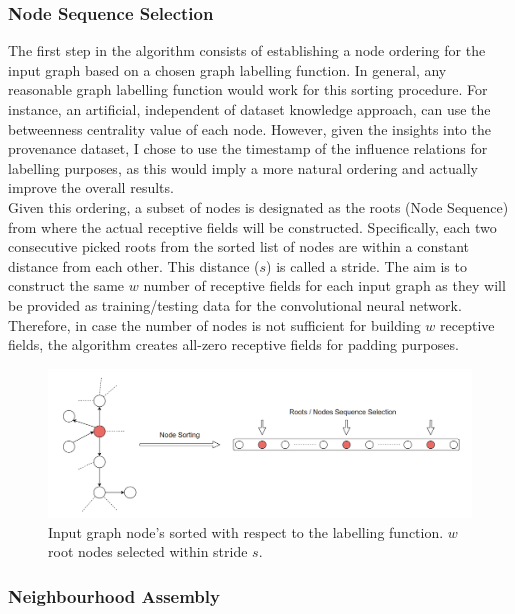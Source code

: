 \subsubsection*{Node Sequence Selection}

The first step in the algorithm consists of establishing a node ordering for the input graph based on a chosen graph labelling function. In general, any reasonable graph labelling function would work for this sorting procedure. For instance, an artificial, independent of dataset knowledge approach, can use the betweenness centrality value of each node. However, given the insights into the provenance dataset, I chose to use the timestamp of the influence relations for labelling purposes, as this would imply a more natural ordering and actually improve the overall results. \\

Given this ordering, a subset of nodes is designated as the roots (Node Sequence) from where the actual receptive fields will be constructed. Specifically, each two consecutive picked roots from the sorted list of nodes are within a constant distance from each other. This distance ($s$) is called a stride. The aim is to construct the same $w$ number of receptive fields for each input graph as they will be provided as training/testing data for the convolutional neural network. Therefore, in case the number of nodes is not sufficient for building $w$ receptive fields, the algorithm creates all-zero receptive fields for padding purposes. \\

\begin{figure}[H]
  \centering
  \includegraphics[scale=0.5]{Images/nodeseqsel.png}
  \caption{Input graph node's sorted with respect to the labelling function. $w$ root nodes selected within stride $s$.}
  \label{nodeseqsel}
\end{figure}

\subsubsection*{Neighbourhood Assembly}

